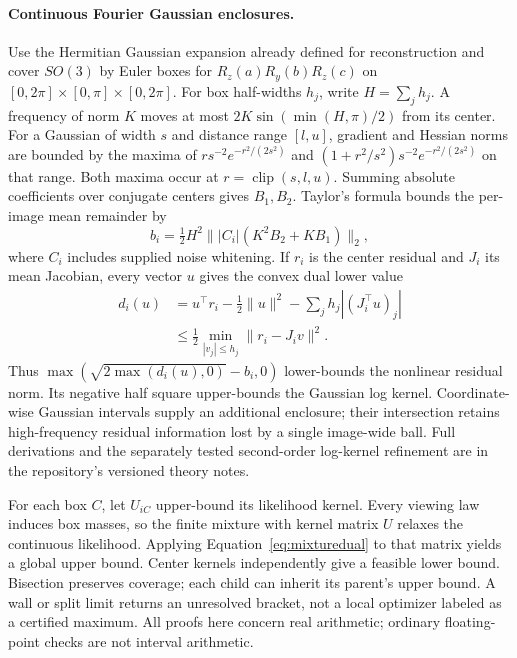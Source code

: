 \paragraph{Continuous Fourier Gaussian enclosures.}
Use the Hermitian Gaussian expansion already defined for reconstruction and
cover $SO(3)$ by Euler boxes for $R_z(a)R_y(b)R_z(c)$ on
$[0,2\pi]\times[0,\pi]\times[0,2\pi]$. For box half-widths $h_j$, write
$H=\sum_jh_j$. A frequency of norm $K$ moves at most
$2K\sin(\min(H,\pi)/2)$ from its center. For a Gaussian of width $s$ and
distance range $[l,u]$, gradient and Hessian norms are bounded by the maxima of
$r s^{-2}e^{-r^2/(2s^2)}$ and
$(1+r^2/s^2)s^{-2}e^{-r^2/(2s^2)}$ on that range. Both maxima occur at
$r=\operatorname{clip}(s,l,u)$. Summing absolute coefficients over conjugate
centers gives $B_1,B_2$. Taylor's formula bounds the per-image mean remainder by
\[
 b_i=\tfrac12H^2\big\| |C_i| (K^2B_2+KB_1)\big\|_2,
\]
where $C_i$ includes supplied noise whitening. If $r_i$ is the center residual
and $J_i$ its mean Jacobian, every vector $u$ gives the convex dual lower value
\begin{align*}
 d_i(u)&=u^\top r_i-\tfrac12\|u\|^2-\sum_jh_j|(J_i^\top u)_j|\\
 &\le\tfrac12\min_{|v_j|\le h_j}\|r_i-J_iv\|^2.
\end{align*}
Thus $\max(\sqrt{2\max(d_i(u),0)}-b_i,0)$ lower-bounds the nonlinear
residual norm. Its negative half square upper-bounds the Gaussian log kernel.
Coordinate-wise Gaussian intervals supply an additional enclosure; their
intersection retains high-frequency residual information lost by a single
image-wide ball. Full derivations and the separately tested second-order
log-kernel refinement are in the repository's versioned theory notes.

For each box $C$, let $U_{iC}$ upper-bound its likelihood kernel. Every viewing
law induces box masses, so the finite mixture with kernel matrix $U$ relaxes
the continuous likelihood. Applying Equation~\eqref{eq:mixturedual} to that
matrix yields a global upper bound. Center kernels independently give a
feasible lower bound. Bisection preserves coverage; each child can inherit
its parent's upper bound. A wall or split limit returns an unresolved bracket,
not a local optimizer labeled as a certified maximum. All proofs here concern
real arithmetic; ordinary floating-point checks are not interval arithmetic.

